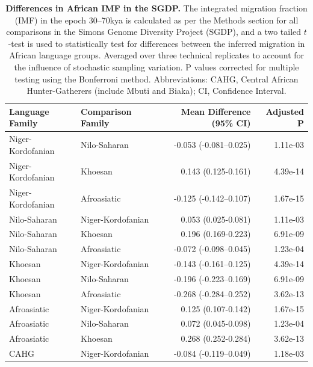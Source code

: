\documentclass{article}
\begin{document}
\begin{table}[ht]
\centering
\begin{tabular}{llrr}
  \hline
Language Family & Comparison Family & Mean Difference (95\% CI) & Adjusted P \\ 
  \hline
Niger-Kordofanian & Nilo-Saharan & -0.053 (-0.081--0.025) & 1.11e-03 \\ 
  Niger-Kordofanian & Khoesan & 0.143 (0.125-0.161) & 4.39e-14 \\ 
  Niger-Kordofanian & Afroasiatic & -0.125 (-0.142--0.107) & 1.67e-15 \\ 
  Nilo-Saharan & Niger-Kordofanian & 0.053 (0.025-0.081) & 1.11e-03 \\ 
  Nilo-Saharan & Khoesan & 0.196 (0.169-0.223) & 6.91e-09 \\ 
  Nilo-Saharan & Afroasiatic & -0.072 (-0.098--0.045) & 1.23e-04 \\ 
  Khoesan & Niger-Kordofanian & -0.143 (-0.161--0.125) & 4.39e-14 \\ 
  Khoesan & Nilo-Saharan & -0.196 (-0.223--0.169) & 6.91e-09 \\ 
  Khoesan & Afroasiatic & -0.268 (-0.284--0.252) & 3.62e-13 \\ 
  Afroasiatic & Niger-Kordofanian & 0.125 (0.107-0.142) & 1.67e-15 \\ 
  Afroasiatic & Nilo-Saharan & 0.072 (0.045-0.098) & 1.23e-04 \\ 
  Afroasiatic & Khoesan & 0.268 (0.252-0.284) & 3.62e-13 \\ 
  CAHG & Niger-Kordofanian & -0.084 (-0.119--0.049) & 1.18e-03 \\ 
   \hline
\end{tabular}
\caption{ {\bf Differences in African IMF in the SGDP.} The integrated migration fraction (IMF) in the epoch 30--70kya is calculated as per the Methods section for all comparisons in the Simons Genome Diversity Project (SGDP), and a two tailed $t$-test is used to statistically test for differences between the inferred migration in African language groups. Averaged over three technical replicates to account for the influence of stochastic sampling variation. P values corrected for multiple testing using the Bonferroni method. Abbreviations: CAHG, Central African Hunter-Gatherers (include Mbuti and Biaka); CI, Confidence Interval.} 
\label{table:sgdp_pairwise}
\end{table}
\end{document}
